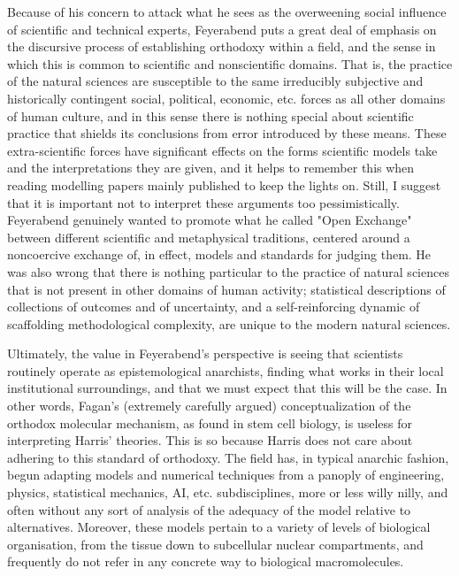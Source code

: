 Because of his concern to attack what he sees as the overweening social influence of scientific and technical experts, Feyerabend puts a great deal of emphasis on the discursive process of establishing orthodoxy within a field, and the sense in which this is common to scientific and nonscientific domains. That is, the practice of the natural sciences are susceptible to the same irreducibly subjective and historically contingent social, political, economic, etc. forces as all other domains of human culture, and in this sense there is nothing special about scientific practice that shields its conclusions from error introduced by these means. These extra-scientific forces have significant effects on the forms scientific models take and the interpretations they are given, and it helps to remember this when reading modelling papers mainly published to keep the lights on. Still, I suggest that it is important not to interpret these arguments too pessimistically. Feyerabend genuinely wanted to promote what he called "Open Exchange" between different scientific and metaphysical traditions, centered around a noncoercive exchange of, in effect, models and standards for judging them. He was also wrong that there is nothing particular to the practice of natural sciences that is not present in other domains of human activity; statistical descriptions of collections of outcomes and of uncertainty, and a self-reinforcing dynamic of scaffolding methodological complexity, are unique to the modern natural sciences.

Ultimately, the value in Feyerabend's perspective is seeing that scientists routinely operate as epistemological anarchists, finding what works in their local institutional surroundings, and that we must expect that this will be the case. In other words, Fagan's (extremely carefully argued) conceptualization of the orthodox molecular mechanism, as found in stem cell biology, is useless for interpreting Harris' theories. This is so because Harris does not care about adhering to this standard of orthodoxy. The field has, in typical anarchic fashion, begun adapting models and numerical techniques from a panoply of engineering, physics, statistical mechanics, AI, etc. subdisciplines, more or less willy nilly, and often without any sort of analysis of the adequacy of the model relative to alternatives. Moreover, these models pertain to a variety of levels of biological organisation, from the tissue down to subcellular nuclear compartments, and frequently do not refer in any concrete way to biological macromolecules.

